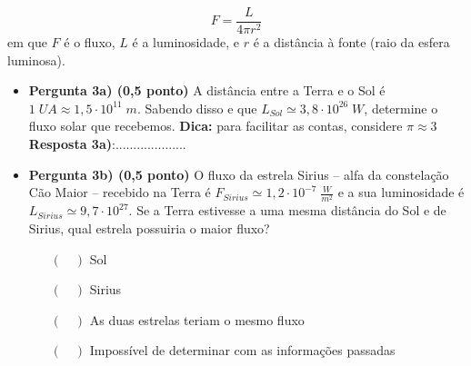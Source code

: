 \documentclass[a4paper, 12pt]{article}
\begin{document}
\begin{flushleft}
\begin{itemize}
				$$F = \frac{L}{4 \pi r^2}$$
			em que $F$ é o fluxo, $L$ é a luminosidade, e $r$ é a distância à fonte (raio da esfera luminosa).
			\begin{itemize}
				\item \textbf{Pergunta 3a) (0,5 ponto)} A distância entre a Terra e o Sol é $1 \; UA \approx 1,5 \cdot 10^{11} \; m$. Sabendo disso e que $L_{Sol} \simeq 3,8 \cdot 10^{26} \; W$, determine o fluxo solar que recebemos. \linebreak
					\textbf{Dica:} para facilitar as contas, considere $\pi \approx 3$
					\linebreak \linebreak \linebreak \linebreak \linebreak \linebreak \linebreak \linebreak \linebreak
					\textbf{Resposta 3a)}:....................
				\item \textbf{Pergunta 3b) (0,5 ponto)} O fluxo da estrela Sirius -- alfa da constelação Cão Maior -- recebido na Terra é $F_{Sirius} \simeq 1,2 \cdot 10^{-7} \; \frac{W}{m^2}$ e a sua luminosidade é $L_{Sirius} \simeq 9,7 \cdot 10^{27}$. Se a Terra estivesse a uma mesma distância do Sol e de Sirius, qual estrela possuiria o maior fluxo?
					\begin{itemize}
						\item[$(\quad)$] Sol
						\item[$(\quad)$] Sirius
						\item[$(\quad)$] As duas estrelas teriam o mesmo fluxo
						\item[$(\quad)$] Impossível de determinar com as informações passadas
					\end{itemize}
			\end{itemize}
			

\end{itemize}
\end{flushleft}
\end{document}
